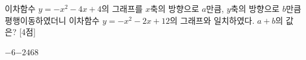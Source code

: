 이차함수 $y=-x^2-4x+4$의 그래프를 $x$축의 방향으로 $a$만큼, $y$축의 방향으로 $b$만큼 평행이동하였더니 이차함수 $y=-x^2-2x+12$의 그래프와 일치하였다. $a+b$의 값은? \mbox{[4점]}
\begin{choices32}{$-6$}{$-2$}{$4$}{$6$}{$8$}\end{choices32}
